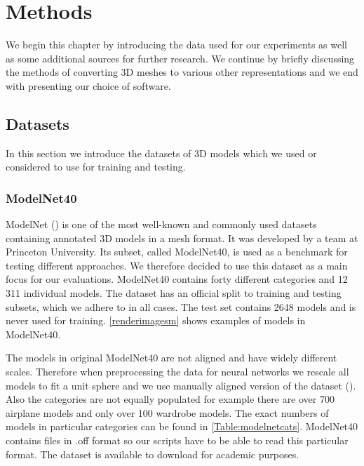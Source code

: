 \chapter{Methods}
\label{sec:chap4}
We begin this chapter by introducing the data used for our experiments as well as some additional sources for further research. We continue by briefly discussing the methods of converting 3D meshes to various other representations and we end with presenting our choice of software.

\section{Datasets}
\label{sec:dataset}
In this section we introduce the datasets of 3D models which we used or considered to use for training and testing.

\subsection{ModelNet40}
\label{sec:modelnet}
ModelNet (\cite{wu_3d_2014}) is one of the most well-known and commonly used datasets containing annotated 3D models in a mesh format. It was developed by a team at Princeton University. Its subset, called ModelNet40, is used as a benchmark for testing different approaches. We therefore decided to use this dataset as a main focus for our evaluations. ModelNet40 contains forty different categories and 12 311 individual models. The dataset has an official split to training and testing subsets, which we adhere to in all cases. The test set contains 2648 models and is never used for training. \autoref{renderimagesm} shows examples of models in ModelNet40.\par



The models in original ModelNet40 are not aligned and have widely different scales. Therefore when preprocessing the data for neural networks we rescale all models to fit a  unit sphere and we use manually aligned version of the dataset (\cite{sedaghat_orientation-boosted_2016}). Also the categories are not equally populated for example there are over 700 airplane models and only over 100 wardrobe models. The exact numbers of models in particular categories can be found in \autoref{Table:modelnetcats}. ModelNet40 contains files in .off format so our scripts have to be able to read this particular format. The dataset is available to download for academic purposes.

